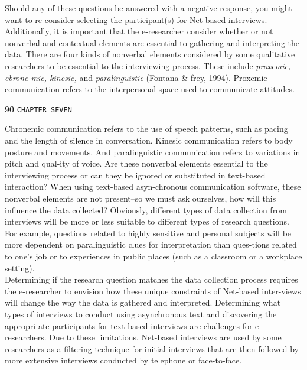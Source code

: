 \documentclass[,a49pt]{book}
\begin{document}
Should any of these questions be answered with a negative response, you might want to re-consider selecting the participant(s) for Net-based interviews.\\
\hspace*{0.5cm} Additionally, it is important that the e-researcher consider whether or not nonverbal and contextual elements are essential to gathering and interpreting the data. There are four kinds of nonverbal elements considered by some qualitative researchers to be essential to the interviewing process. These include \emph{proxemic, cbrone-mic, kinesic,} and \emph{paralinguistic} (Fontana \& frey, 1994). Proxemic communication refers to the interpersonal space used to communicate attitudes.

\newpage
\begin{flushleft}
\textbf{90}\hspace*{1cm} \texttt{CHAPTER SEVEN}
\end{flushleft}

\vspace*{0.5cm}
Chronemic communication refers to the use of speech patterns, such as pacing and the length of silence in conversation. Kinesic communication refers to body posture and movements. And paralinguistic communication refers to variations in pitch and qual-ity of voice. Are these nonverbal elements essential to the interviewing process or can they be ignored or substituted in text-based interaction? When using text-based asyn-chronous communication software, these nonverbal elements are not present--so we must ask ourselves, how will this influence the data collected? Obviously, different types of data collection from interviews will be more or less suitable to different types of research questions. For example, questions related to highly sensitive and personal subjects will be more dependent on paralinguistic clues for interpretation than ques-tions related to one's job or to experiences in public places (such as a classroom or a workplace setting). \\

\hspace*{0.5cm} Determining if the research question matches the data collection process requires the e-researcher to envision how these unique constraints of Net-based inter-views will change the way the data is gathered and interpreted. Determining what types of interviews to conduct using asynchronous text and discovering the appropri-ate participants for text-based interviews are challenges for e-researchers. Due to these limitations, Net-based interviews are used by some researchers as a filtering technique for initial interviews that are then followed by more extensive interviews conducted by telephone or face-to-face. \\
\end{document}

